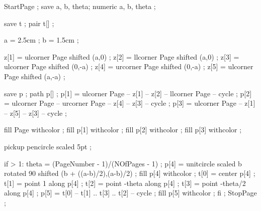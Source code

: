 StartPage ;
save a, b,  theta;
numeric a, b,  theta ;

save t ;
pair  t[] ;

a = 2.5cm ;
b = 1.5cm ;

z[1] = ulcorner Page shifted (a,0) ;
z[2] = llcorner Page shifted (a,0) ;
z[3] = ulcorner Page shifted (0,-a) ;
z[4] = urcorner Page shifted (0,-a) ;
z[5] = ulcorner Page shifted (a,-a) ;

save p ;
path p[] ;
p[1] = ulcorner Page -- z[1] -- z[2] -- llcorner Page -- cycle ;
p[2] = ulcorner Page -- urcorner Page -- z[4] -- z[3] -- cycle ;
p[3] = ulcorner Page -- z[1] -- z[5] -- z[3] -- cycle ;

fill Page withcolor  ;
fill p[1] withcolor  ;
fill p[2] withcolor  ;
fill p[3] withcolor  ;

pickup pencircle scaled 5pt ;

if \realfolio > 1:
	theta = (PageNumber - 1)/(NOfPages - 1) ;
	p[4] = unitcircle scaled b rotated 90 shifted (b + ((a-b)/2),(a-b)/2) ;
	fill p[4] withcolor  ;
	t[0] = center p[4] ;
	t[1] = point 1 along p[4] ;
	t[2] = point -theta along p[4] ;
	t[3] = point -theta/2 along p[4] ;
	p[5] = t[0] -- t[1] .. t[3] .. t[2] -- cycle ;
	fill p[5] withcolor  ;
fi ;
StopPage ;
\stopuseMPgraphic





\setupTitle[\c!headcolor={simpleslides:contrastcolor}]


\setupSlideTitle
   [\c!after=,
    \c!alternative=layer,
    \c!width=\textwidth,
    \c!height=2.5cm,
    \c!color=simpleslides:backgroundcolor]


\setupitemize[1][inmargin][color=simpleslides:backgroundcolor]

\protect
\stopmodule

\endinput

